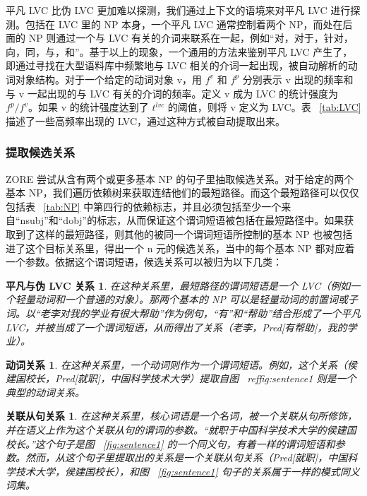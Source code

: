 平凡 LVC 比伪 LVC 更加难以探测，我们通过上下文的语境来对平凡 LVC 进行探测。包括在 LVC 里的 NP 本身，一个平凡 LVC 通常控制着两个 NP，而处在后面的 NP 则通过一个与 LVC 有关的介词来联系在一起，例如“对，对于，针对，向，同，与，和”。基于以上的现象，一个通用的方法来鉴别平凡 LVC 产生了，即通过寻找在大型语料库中频繁地与 LVC 相关的介词一起出现，被自动解析的动词对象结构。对于一个给定的动词对象 v，用 $f^v$ 和 $f^p$ 分别表示 v 出现的频率和与 v 一起出现的与 LVC 有关的介词的频率。定义 v 成为 LVC 的统计强度为 $f^p / f^v$。如果 v 的统计强度达到了 $t^{lvc}$ 的阈值，则将 v 定义为 LVC。表 ~\ref{tab:LVC} 描述了一些高频率出现的 LVC，通过这种方式被自动提取出来。

\subsubsection{提取候选关系}
ZORE 尝试从含有两个或更多基本 NP 的句子里抽取候选关系。对于给定的两个基本 NP，我们遍历依赖树来获取连结他们的最短路径。而这个最短路径可以仅仅包括表 ~\ref{tab:NP} 中第四行的依赖标志，并且必须包括至少一个来自“nsubj”和“dobj”的标志，从而保证这个谓词短语被包括在最短路径中。如果获取到了这样的最短路径，则其他的被同一个谓词短语所控制的基本 NP 也被包括进了这个目标关系里，得出一个 n 元的候选关系，当中的每个基本 NP 都对应着一个参数。依据这个谓词短语，候选关系可以被归为以下几类：

\newtheorem*{CDLR}{平凡与伪 LVC 关系}
\begin{CDLR}
    在这种关系里，最短路径的谓词短语是一个 LVC（例如一个轻量动词和一个普通的对象）。那两个基本的 NP 可以是轻量动词的前置词或子词。以“老李对我的学业有很大帮助”作为例句，“有”和“帮助”结合形成了一个平凡 LVC，并被当成了一个谓词短语，从而得出了关系（老李，Pred[有帮助]，我的学业）。
\end{CDLR}
\newtheorem*{VR}{动词关系}
\begin{VR}
    在这种关系里，一个动词则作为一个谓词短语。例如，这个关系（侯建国校长，Pred[就职]，中国科学技术大学）提取自图 ~ref{fig:sentence1} 则是一个典型的动词关系。
\end{VR}
\newtheorem*{RCR}{关联从句关系}
\begin{RCR}
    在这种关系里，核心词语是一个名词，被一个关联从句所修饰，并在语义上作为这个关联从句的谓词的参数。“就职于中国科学技术大学的侯建国校长。”这个句子是图 ~\ref{fig:sentence1} 的一个同义句，有着一样的谓词短语和参数。然而，从这个句子里提取出的关系是一个关联从句关系（Pred[就职]，中国科学技术大学，侯建国校长），和图 ~\ref{fig:sentence1} 句子的关系属于一样的模式同义词集。
\end{RCR}

